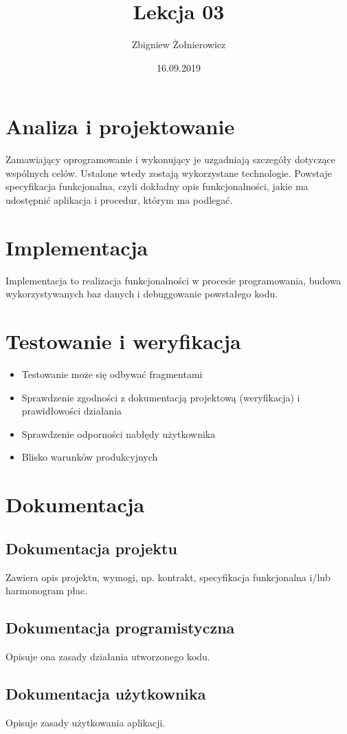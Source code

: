 \documentclass[a4paper]{article}
\begin{document}
\title{{\huge Lekcja 03} \\
    {\large }}
\author{Zbigniew Żołnierowicz}
\date{16.09.2019}
\maketitle
\section{Analiza i projektowanie}
Zamawiający oprogramowanie i wykonujący je uzgadniają szczegóły dotyczące wspólnych celów. Ustalone wtedy zostają wykorzystane technologie. Powstaje specyfikacja funkcjonalna, czyli dokładny opis funkcjonalności, jakie ma udostępnić aplikacja i procedur, którym ma podlegać.
\section{Implementacja}
Implementacja to realizacja funkcjonalności w procesie programowania, budowa wykorzystywanych baz danych i debuggowanie powstałego kodu.
\section{Testowanie i weryfikacja}
\begin{itemize}
    \item Testowanie może się odbywać fragmentami
    \item Sprawdzenie zgodności z dokumentacją projektową (weryfikacja) i prawidłowości działania
    \item Sprawdzenie odporności nabłędy użytkownika
    \item Blisko warunków produkcyjnych 
\end{itemize}
\section{Dokumentacja}
\subsection{Dokumentacja projektu}
Zawiera opis projektu, wymogi, np. kontrakt, specyfikacja funkcjonalna i/lub harmonogram płac.
\subsection{Dokumentacja programistyczna}
Opisuje ona zasady działania utworzonego kodu.
\subsection{Dokumentacja użytkownika}
Opisuje zasady użytkowania aplikacji.
\end{document}
